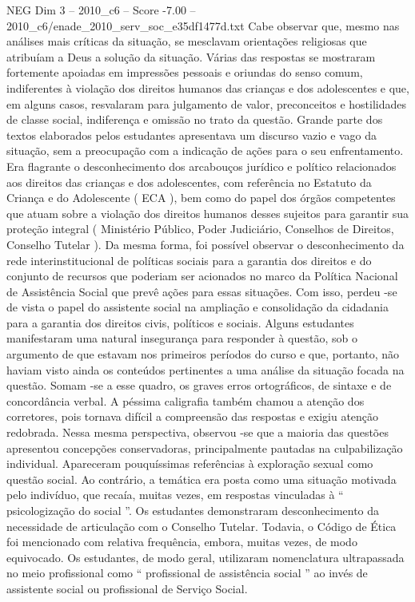 \begin{textsample}{NEG Dim 3 – 2010\_c6 – Score -7.00 – 2010\_c6/enade\_2010\_serv\_soc\_e35df1477d.txt}
Cabe observar que, mesmo nas análises mais críticas da situação, se mesclavam orientações religiosas que atribuíam a Deus a solução da situação.
Várias das respostas se mostraram fortemente apoiadas em impressões pessoais e oriundas do senso comum, indiferentes à violação dos direitos humanos das crianças e dos adolescentes e que, em alguns casos, resvalaram para julgamento de valor, preconceitos e hostilidades de classe social, indiferença e omissão no trato da questão.
Grande parte dos textos elaborados pelos estudantes apresentava um discurso vazio e vago da situação, sem a preocupação com a indicação de ações para o seu enfrentamento.
Era flagrante o desconhecimento dos arcabouços jurídico e político relacionados aos direitos das crianças e dos adolescentes, com referência no Estatuto da Criança e do Adolescente ( ECA ), bem como do papel dos órgãos competentes que atuam sobre a violação dos direitos humanos desses sujeitos para garantir sua proteção integral ( Ministério Público, Poder Judiciário, Conselhos de Direitos, Conselho Tutelar ).
Da mesma forma, foi possível observar o desconhecimento da rede interinstitucional de políticas sociais para a garantia dos direitos e do conjunto de recursos que poderiam ser acionados no marco da Política Nacional de Assistência Social que prevê ações para essas situações.
Com isso, perdeu -se de vista o papel do assistente social na ampliação e consolidação da cidadania para a garantia dos direitos civis, políticos e sociais.
Alguns estudantes manifestaram uma natural insegurança para responder à questão, sob o argumento de que estavam nos primeiros períodos do curso e que, portanto, não haviam visto ainda os conteúdos pertinentes a uma análise da situação focada na questão.
Somam -se a esse quadro, os graves erros ortográficos, de sintaxe e de concordância verbal.
A péssima caligrafia também chamou a atenção dos corretores, pois tornava difícil a compreensão das respostas e exigiu atenção redobrada.
Nessa mesma perspectiva, observou -se que a maioria das questões apresentou concepções conservadoras, principalmente pautadas na culpabilização individual.
Apareceram pouquíssimas referências à exploração sexual como questão social.
Ao contrário, a temática era posta como uma situação motivada pelo indivíduo, que recaía, muitas vezes, em respostas vinculadas à “ psicologização do social ”.
Os estudantes demonstraram desconhecimento da necessidade de articulação com o Conselho Tutelar.
Todavia, o Código de Ética foi mencionado com relativa frequência, embora, muitas vezes, de modo equivocado.
Os estudantes, de modo geral, utilizaram nomenclatura ultrapassada no meio profissional como “ profissional de assistência social ” ao invés de assistente social ou profissional de Serviço Social.

\end{textsample}
